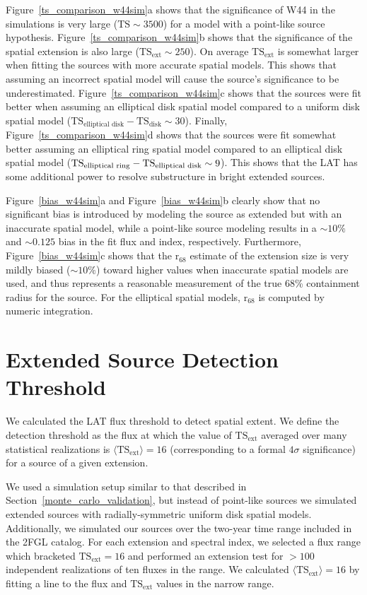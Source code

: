 \documentclass[12pt,preprint]{aastex}
\newcommand{\tsext}{{\ensuremath{\text{TS}_{\text{ext}}}}\xspace}
\newcommand{\rsixeight}{{\ensuremath{\text{r}_{68}}}\xspace}
\newcommand{\ts}{\text{TS}\xspace}
\begin{document}
Figure~\ref{ts_comparison_w44sim}a 
shows that
the significance of W44 in the simulations is very large ($\ts\sim3500$) 
for a model with a point-like source hypothesis.
Figure~\ref{ts_comparison_w44sim}b shows that 
the significance of the spatial extension is also large
($\tsext\sim250$).  
On average \tsext is somewhat larger when fitting
the sources with more accurate spatial models.  This shows that
assuming an incorrect spatial model will cause the source's
significance to be underestimated.  Figure~\ref{ts_comparison_w44sim}c
shows that the sources were fit better when assuming an elliptical
disk spatial model compared to a uniform disk spatial model
($\ts_\text{elliptical\ disk}-\ts_\text{disk}\sim30$).  Finally,
Figure~\ref{ts_comparison_w44sim}d shows that the sources were
fit somewhat better assuming an elliptical ring spatial model
compared to an elliptical disk spatial model ($\ts_\text{elliptical\
ring}-\ts_\text{elliptical\ disk}\sim9$). This shows that the LAT has
some additional power to resolve substructure in bright extended sources.


Figure~\ref{bias_w44sim}a and Figure~\ref{bias_w44sim}b clearly show that
no significant bias is introduced by modeling the source as extended
but with an inaccurate spatial model, while a point-like source modeling
results in a $\sim10\%$ and $\sim0.125$ bias in the fit flux and index,
respectively.  
Furthermore, Figure~\ref{bias_w44sim}c shows that the \rsixeight estimate of
the extension size is very mildly biased ($\sim10\%$) toward higher values
when inaccurate spatial models are used, and thus represents a reasonable
measurement of the true 68\% containment radius for the source.
For the elliptical spatial models, \rsixeight is computed by numeric integration.


\section{Extended Source Detection Threshold}
\label{extension_sensitivity}

We calculated the LAT flux 
threshold to detect spatial extent. We define the detection threshold as the flux at
which the value of $\tsext$ averaged over many statistical realizations is
$\langle\tsext\rangle=16$ 
(corresponding to a formal $4\sigma$ significance)
for a source of a given extension.

We used a simulation setup similar to that described in
Section~\ref{monte_carlo_validation}, but instead of point-like sources
we simulated extended sources with radially-symmetric uniform disk spatial 
models. Additionally, we simulated our sources over the two-year
time range included in the 2FGL catalog.  For each extension and spectral index,
we selected a flux range which bracketed $\tsext=16$ and performed an
extension test for $>100$ independent realizations of ten fluxes in
the range.  We calculated $\langle\tsext\rangle=16$ by fitting a line
to the flux and $\tsext$ values in the narrow range.
\end{document}
